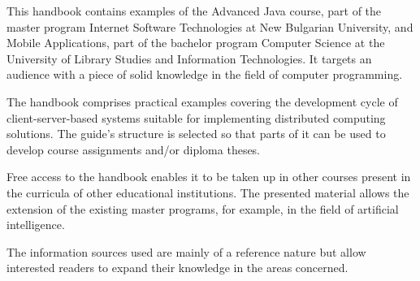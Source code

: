 This handbook contains examples of the Advanced Java course, part of the master program Internet Software Technologies at New Bulgarian University, and Mobile Applications, part of the bachelor program Computer Science at the University of Library Studies and Information Technologies. It targets an audience with a piece of solid knowledge in the field of computer programming.

The handbook comprises practical examples covering the development cycle of client-server-based systems suitable for implementing distributed computing solutions. The guide's structure is selected so that parts of it can be used to develop course assignments and/or diploma theses.

Free access to the handbook enables it to be taken up in other courses present in the curricula of other educational institutions. The presented material allows the extension of the existing master programs, for example, in the field of artificial intelligence.

The information sources used are mainly of a reference nature but allow interested readers to expand their knowledge in the areas concerned.

